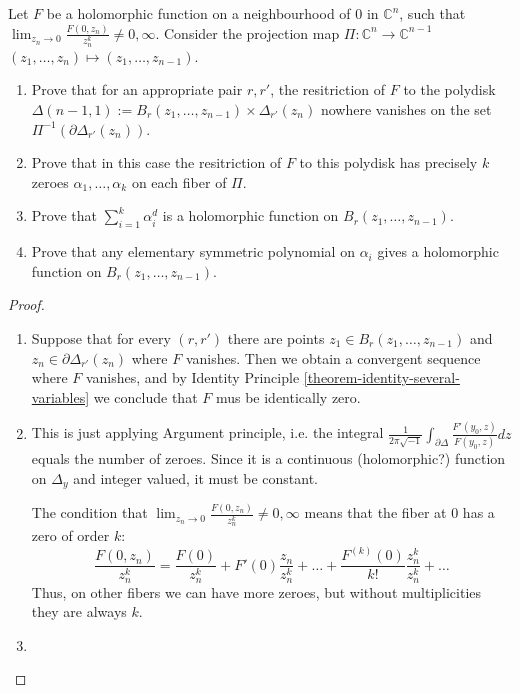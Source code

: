 \begin{exercise}
\label{exercise-polydisks}
Let $F$ be a holomorphic function on a neighbourhood of $0$ in $\mathbb{C}^n$,
such that $\lim_{z_n\to 0} \frac{F(0,z_n)}{z_n^k}\neq 0,\infty$.
Consider the projection map $\Pi:\mathbb{C}^n\to\mathbb{C}^{n-1}$ 
$(z_1,\ldots,z_n)\mapsto (z_1,\ldots,z_{n-1})$.
\begin{enumerate}
\item Prove that for an appropriate pair $r,r'$, the resitriction of $F$ to the
polydisk $\Delta(n-1,1):=B_r(z_1,\ldots,z_{n-1})\times\Delta_{r'}(z_n)$ nowhere
vanishes on the set $\Pi^{-1}(\partial\Delta_{r'}(z_n))$.
\item Prove that in this case the resitriction of $F$ to this polydisk has
precisely $k$ zeroes $\alpha_1,\ldots,\alpha_k$ on each fiber of $\Pi$.
\item Prove that $\sum_{i=1}^k \alpha_i^d$ is a holomorphic function on
$B_r(z_1,\ldots,z_{n-1})$.
\item Prove that any elementary symmetric polynomial on $\alpha_i$ gives a
holomorphic function on $B_r(z_1,\ldots,z_{n-1})$.
\end{enumerate}
\end{exercise}

\begin{proof}
\begin{enumerate}
\item Suppose that for every $(r,r')$ there are points 
$z_1\in B_r(z_1,\ldots,z_{n-1})$ and $z_n\in \partial\Delta_{r'}(z_n)$
where $F$ vanishes. Then we obtain a convergent sequence where $F$
vanishes, and by Identity Principle \ref{theorem-identity-several-variables} we
conclude that $F$ mus be identically zero.
\item This is just applying Argument principle, i.e. the integral 
$\frac{1}{2\pi\sqrt{-1}}\int_{\partial \Delta}\frac{F'(y_0,z)}{F(y_0,z)}dz$ 
equals the number of zeroes. Since it is a continuous (holomorphic?) function on
$\Delta_y$ and integer valued, it must be constant.

The condition that $\lim_{z_n\to0}\frac{F(0,z_n)}{z_n^k}\neq 0,\infty$ means
that the fiber at 0 has a zero of order $k$:
$$
\frac{F(0,z_n)}{z_n^k}=\frac{F(0)}{z_n^k}+F'(0)\frac{z_n}{z_n^k}+\ldots
+\frac{F^{(k)}(0)}{k!}\frac{z_n^k}{z_n^k}+\ldots
$$
Thus, on other fibers we can have
more zeroes, but without multiplicities they are always $k$.
\item 
\end{enumerate}
\end{proof}


